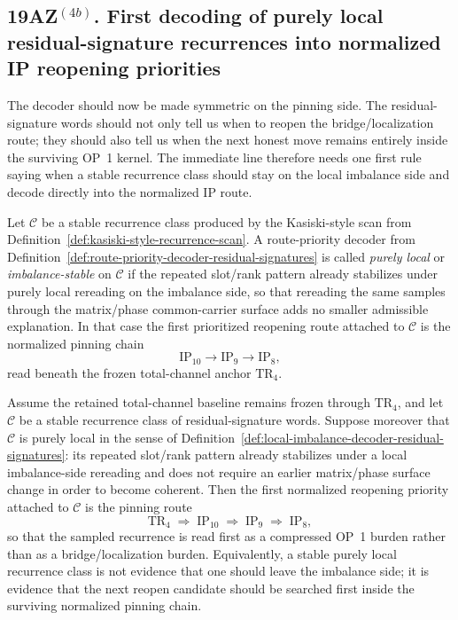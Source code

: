 \subsection*{19AZ$^{(4b)}$. First decoding of purely local residual-signature recurrences into normalized IP reopening priorities}
\label{sec:first-decoding-of-local-signature-recurrences-into-ip-priorities}
The decoder should now be made symmetric on the pinning side. The residual-signature words should not only tell us when to reopen the bridge/localization route; they should also tell us when the next honest move remains entirely inside the surviving OP~1 kernel. The immediate line therefore needs one first rule saying when a stable recurrence class should stay on the local imbalance side and decode directly into the normalized IP route.

\begin{definition}
\label{def:local-imbalance-decoder-residual-signatures}
Let \(\mathcal C\) be a stable recurrence class produced by the Kasiski-style scan from Definition~\ref{def:kasiski-style-recurrence-scan}. A route-priority decoder from Definition~\ref{def:route-priority-decoder-residual-signatures} is called \emph{purely local} or \emph{imbalance-stable} on \(\mathcal C\) if the repeated slot/rank pattern already stabilizes under purely local rereading on the imbalance side, so that rereading the same samples through the matrix/phase common-carrier surface adds no smaller admissible explanation. In that case the first prioritized reopening route attached to \(\mathcal C\) is the normalized pinning chain
\[
\mathrm{IP}_{10} \to \mathrm{IP}_9 \to \mathrm{IP}_8,
\]
read beneath the frozen total-channel anchor \(\mathrm{TR}_4\).
\end{definition}

\begin{proposition}
\label{prop:purely-local-signature-classes-prioritize-ip-route}
Assume the retained total-channel baseline remains frozen through \(\mathrm{TR}_4\), and let \(\mathcal C\) be a stable recurrence class of residual-signature words. Suppose moreover that \(\mathcal C\) is purely local in the sense of Definition~\ref{def:local-imbalance-decoder-residual-signatures}: its repeated slot/rank pattern already stabilizes under a local imbalance-side rereading and does not require an earlier matrix/phase surface change in order to become coherent. Then the first normalized reopening priority attached to \(\mathcal C\) is the pinning route
\[
\mathrm{TR}_4 \;\Longrightarrow\; \mathrm{IP}_{10} \;\Longrightarrow\; \mathrm{IP}_9 \;\Longrightarrow\; \mathrm{IP}_8,
\]
so that the sampled recurrence is read first as a compressed OP~1 burden rather than as a bridge/localization burden.
Equivalently, a stable purely local recurrence class is not evidence that one should leave the imbalance side; it is evidence that the next reopen candidate should be searched first inside the surviving normalized pinning chain.
\end{proposition}

